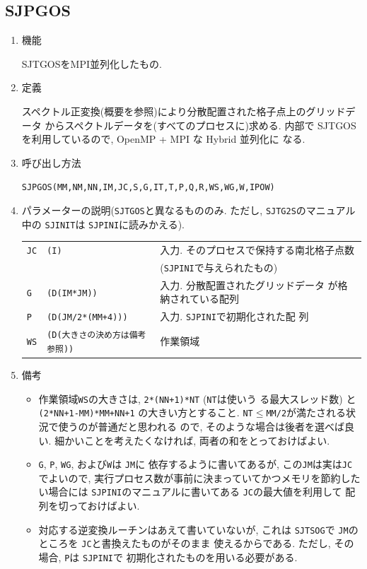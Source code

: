 \documentclass[a4j,fleqn]{jarticle}
\begin{document}

\subsection{SJPGOS}

\begin{enumerate}

\item 機能

SJTGOSをMPI並列化したもの.

\item 定義

スペクトル正変換(概要を参照)により分散配置された格子点上のグリッドデータ
からスペクトルデータを(すべてのプロセスに)求める.
内部で SJTGOS を利用しているので, OpenMP + MPI な Hybrid 並列化に
なる.

\item 呼び出し方法 

{\tt SJPGOS(MM,NM,NN,IM,JC,S,G,IT,T,P,Q,R,WS,WG,W,IPOW)}
  
\item パラメーターの説明({\tt SJTGOS}と異なるもののみ.
ただし, {\tt SJTG2S}のマニュアル中の {\tt SJINIT}は
{\tt SJPINI}に読みかえる).

\begin{tabular}{lll}
{\tt JC} & {\tt (I)} & 入力. そのプロセスで保持する南北格子点数\\
 & &                       ({\tt SJPINI}で与えられたもの)\\
{\tt G} & {\tt (D(IM*JM))} & 入力. 分散配置されたグリッドデータ
	が格納されている配列\\
{\tt P}  & {\tt (D(JM/2*(MM+4)))} & 入力. {\tt SJPINI}で初期化された配
列\\
{\tt WS} & {\tt (D(大きさの決め方は備考参照))} 
& 作業領域
\end{tabular}

\item 備考

\begin{itemize}

\item 作業領域{\tt WS}の大きさは, {\tt 2*(NN+1)*NT} ({\tt NT}は使いう
  る最大スレッド数) と {\tt (2*NN+1-MM)*MM+NN+1} の大きい方とすること.
  {\tt NT}$\le${\tt MM/2}が満たされる状況で使うのが普通だと思われる
  ので, そのような場合は後者を選べば良い. 
  細かいことを考えたくなければ, 両者の和をとっておけばよい.

\item {\tt G}, {\tt P}, {\tt WG}, および{\tt W}は {\tt JM}に
依存するように書いてあるが, この{\tt JM}は実は{\tt JC}でよいので,
実行プロセス数が事前に決まっていてかつメモリを節約したい場合には
{\tt SJPINI}のマニュアルに書いてある {\tt JC}の最大値を利用して
配列を切っておけばよい.
   
\item 対応する逆変換ルーチンはあえて書いていないが, これは
 {\tt SJTSOG}で {\tt JM}のところを {\tt JC}と書換えたものがそのまま
 使えるからである. ただし, その場合, {\tt P}は {\tt SJPINI}で
 初期化されたものを用いる必要がある.

\end{itemize}

\end{enumerate}
\end{document}
